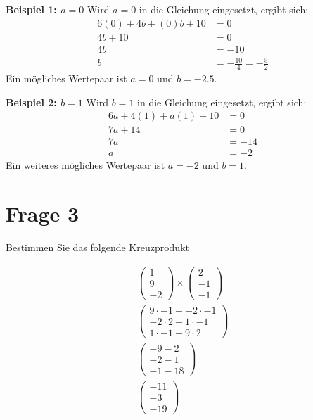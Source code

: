 \textbf{Beispiel 1: $a=0$}
Wird $a=0$ in die Gleichung eingesetzt, ergibt sich:
\begin{align*}
    6(0) + 4b + (0)b + 10 &= 0 \\
    4b + 10 &= 0 \\
    4b &= -10 \\
    b &= -\frac{10}{4} = -\frac{5}{2}
\end{align*}
Ein mögliches Wertepaar ist $a=0$ und $b = -2.5$.

\textbf{Beispiel 2: $b=1$}
Wird $b=1$ in die Gleichung eingesetzt, ergibt sich:
\begin{align*}
    6a + 4(1) + a(1) + 10 &= 0 \\
    7a + 14 &= 0 \\
    7a &= -14 \\
    a &= -2
\end{align*}
Ein weiteres mögliches Wertepaar ist $a=-2$ und $b=1$.

\section{Frage 3}

Bestimmen Sie das folgende Kreuzprodukt

\begin{align*}
    \begin{pmatrix}
        1 \\ 9 \\ -2
    \end{pmatrix} \times \begin{pmatrix}
        2 \\ -1 \\ -1
    \end{pmatrix} \\
    \begin{pmatrix}
        9 \cdot -1 - -2 \cdot -1 \\
        -2 \cdot 2 - 1 \cdot -1 \\
        1 \cdot -1 - 9 \cdot 2
    \end{pmatrix} \\
    \begin{pmatrix}
        -9 - 2\\
        -2 - 1 \\
        -1 - 18
    \end{pmatrix} \\
    \begin{pmatrix}
        -11 \\ -3 \\ -19
    \end{pmatrix}
\end{align*}

